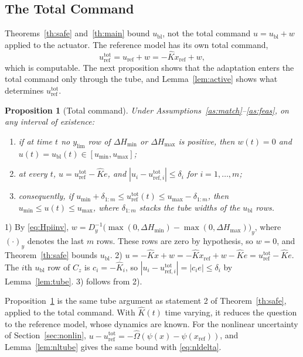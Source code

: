 \documentclass[lettersize,journal]{IEEEtran}
\newtheorem{proposition}{Proposition}
\newcommand{\Kh}{\hat{K}}
\newcommand{\xr}{x_{\mathrm{ref}}}
\newcommand{\ub}{u_{\mathrm{bl}}}
\newcommand{\uref}{u_{\mathrm{ref}}}
\newcommand{\utot}{u_{\mathrm{ref}}^{\mathrm{tot}}}
\newcommand{\ylim}{y_{\mathrm{lim}}}
\begin{document}
\subsection{The Total Command}

Theorems~\ref{th:safe} and~\ref{th:main} bound $\ub$, not the total command $u=\ub+w$ applied to the actuator. The reference model has its own total command,
\begin{equation}
\utot=\uref+w=-\Kh\xr+w, \label{eq:utot}
\end{equation}
which is computable. The next proposition shows that the adaptation enters the total command only through the tube, and Lemma~\ref{lem:active} shows what determines $\utot$.

\begin{proposition}[Total command] \label{prop:input}
Under Assumptions~\ref{as:match}--\ref{as:feas}, on any interval of existence:
\begin{enumerate}
\item if at time $t$ no $\ylim$ row of $\Delta H_{\min}$ or $\Delta H_{\max}$ is positive, then $w(t)=0$ and $u(t)=\ub(t)\in[u_{\min},u_{\max}]$;
\item at every $t$, $u=\utot-\Kh e$, and $|u_i-u^{\mathrm{tot}}_{\mathrm{ref},i}|\le\delta_i$ for $i=1,\dots,m$;
\item consequently, if $u_{\min}+\delta_{1:m}\le\utot(t)\le u_{\max}-\delta_{1:m}$, then $u_{\min}\le u(t)\le u_{\max}$, where $\delta_{1:m}$ stacks the tube widths of the $\ub$ rows.
\end{enumerate}
\end{proposition}
\begin{IEEEproof}
1) By \eqref{eq:Hpiinv}, $w=D_y^{-1}\big(\max(0,\Delta H_{\min})-\max(0,\Delta H_{\max})\big)_{y}$, where $(\cdot)_y$ denotes the last $m$ rows. These rows are zero by hypothesis, so $w=0$, and Theorem~\ref{th:safe} bounds $\ub$. 2) $u=-\Kh x+w=-\Kh\xr+w-\Kh e=\utot-\Kh e$. The $i$th $\ub$ row of $C_z$ is $c_i=-\Kh_i$, so $|u_i-u^{\mathrm{tot}}_{\mathrm{ref},i}|=|c_ie|\le\delta_i$ by Lemma~\ref{lem:tube}. 3) follows from 2).
\end{IEEEproof}

Proposition~\ref{prop:input} is the same tube argument as statement 2 of Theorem~\ref{th:safe}, applied to the total command. With $\Kh(t)$ time varying, it reduces the question to the reference model, whose dynamics are known. For the nonlinear uncertainty of Section~\ref{sec:nonlin}, $u-\utot=-\hat\Omega(\psi(x)-\psi(\xr))$, and Lemma~\ref{lem:nltube} gives the same bound with \eqref{eq:nldelta}.
\end{document}
